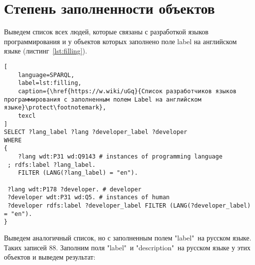 \section{Степень заполненности объектов}

\label{question:prog_lang_3}

Выведем список всех людей, которые связаны с разработкой языков программирования и у объектов которых заполнено поле label  на английском языке (листинг~\ref{lst:filling}).

\begin{lstlisting}[
	language=SPARQL,
	label=lst:filling,
	caption={\href{https://w.wiki/uGq}{Список разработчиков языков программирования с заполненным полем Label на английском языке}\protect\footnotemark},
	texcl
]
SELECT ?lang_label ?lang ?developer_label ?developer
WHERE
{
 	?lang wdt:P31 wd:Q9143 # instances of programming language
 ; rdfs:label ?lang_label. 
 	FILTER (LANG(?lang_label) = "en"). 

 ?lang wdt:P178 ?developer. # developer 
 ?developer wdt:P31 wd:Q5. # instances of human
 ?developer rdfs:label ?developer_label FILTER (LANG(?developer_label) = "en"). 
}
\end{lstlisting}
Выведем аналогичный список, но с заполненным полем "label"\  на русском языке. Таких записей 88. Заполним поля "label"\  и "description"\  на русском языке у этих объектов и выведем результат:

